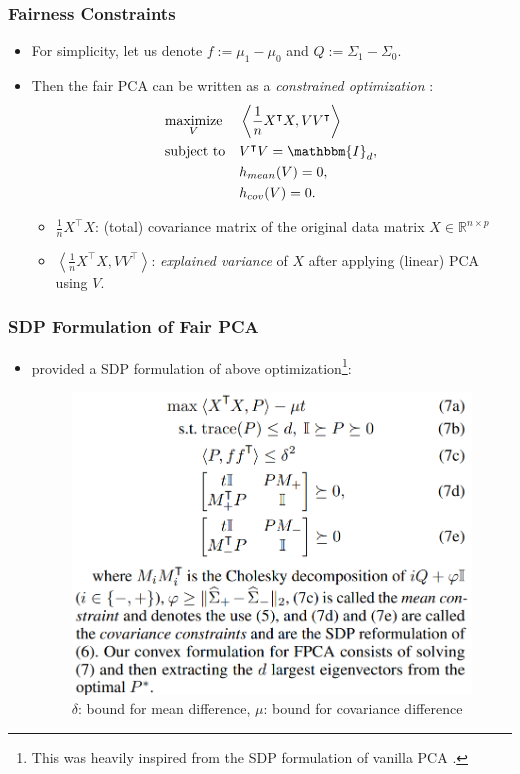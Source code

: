 \documentclass{beamer}
\begin{document}
	\begin{frame}
	\frametitle{Fairness Constraints}
		\begin{itemize}
			\item For simplicity, let us denote $f := \mu_1 - \mu_0$ and $Q := \Sigma_1 - \Sigma_0$.
			
			\item Then the fair PCA can be written as a {\it constrained optimization} :
			\begin{equation}
				\label{eq:FPCA}
				\begin{aligned}
					& \underset{V}{\text{maximize}}
					& &  %
					\left\langle \frac{1}{n} X^\intercal X, V V^\intercal \right\rangle\\
					& \text{subject to}
					& & V^\intercal V = \mathbbm{I}_d, \\
					&&& h_{mean}(V) = 0, \\
					&&& h_{cov}(V) = 0.
				\end{aligned}
			\end{equation}
			
			\begin{itemize}
				\item $\frac{1}{n} X^\intercal X$: (total) covariance matrix of the original data matrix $X \in \mathbb{R}^{n \times p}$
				
				\item $\left\langle \frac{1}{n} X^\intercal X, V V^\intercal \right\rangle$: {\it explained variance} of $X$ after applying (linear) PCA using $V$.
			\end{itemize}			
		\end{itemize}
	\end{frame}

	\begin{frame}
	\frametitle{SDP Formulation of Fair PCA}
	\begin{itemize}
		\item \cite{OA19} provided a SDP formulation of above optimization\footnote{This was heavily inspired from the SDP formulation of vanilla PCA \cite{ACS13}.}:
		\begin{figure}
			\centering
			\includegraphics[width=0.6\linewidth]{sdp}
			\caption{$\delta$: bound for mean difference, $\mu$: bound for covariance difference}
			\label{fig:sdp}
		\end{figure}
	\end{itemize}
	\end{frame}
\end{document}
